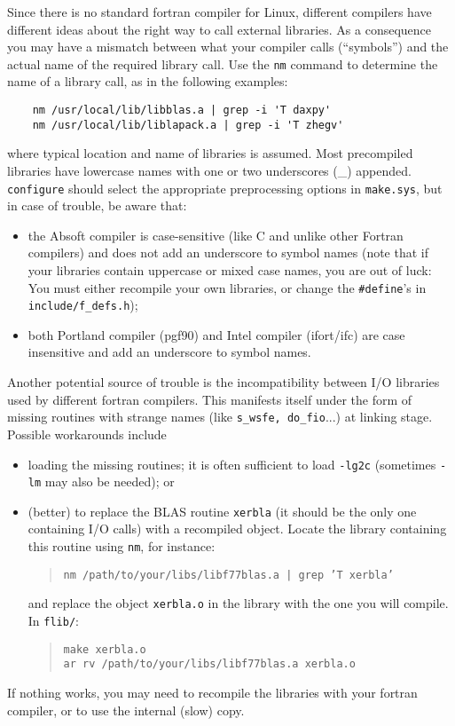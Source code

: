 \documentclass[12pt,a4paper]{article}
\begin{document}
Since there is no standard fortran compiler for Linux, different compilers
have different ideas about the right way to call external libraries.
As a consequence you may have a mismatch between what your compiler
calls (``symbols'') and the actual name of the required library call.
Use the \texttt{nm} command to determine the name of a library call,
as in the following examples:%
\begin{verbatim}
    nm /usr/local/lib/libblas.a | grep -i 'T daxpy'
    nm /usr/local/lib/liblapack.a | grep -i 'T zhegv'
\end{verbatim}
where typical location and name of libraries is assumed.
Most precompiled libraries have lowercase names with one or two
underscores (\_) appended. \texttt{configure} should select the 
appropriate preprocessing options in \texttt{make.sys}, but in
case of trouble, be aware that:
\begin{itemize}
  \item the Absoft compiler is case-sensitive (like C and unlike
        other Fortran compilers) and does not add an underscore
        to symbol names (note that if your libraries contain 
        uppercase or mixed case names, you are out of luck:
        You must either recompile your own libraries, or change 
        the \texttt{\#define}'s in \texttt{include/f\_defs.h});
  \item both Portland compiler (pgf90) and Intel compiler (ifort/ifc)
        are case insensitive and add an underscore to symbol names.
\end{itemize}

Another potential source of trouble is the incompatibility
between I/O libraries used by different fortran compilers.
This manifests itself under the form of missing routines with 
strange names (like \texttt{s\_wsfe, do\_fio}...) at linking stage. 
Possible workarounds include
\begin{itemize}
\item loading the missing routines; it is often sufficient to load
\texttt{-lg2c} (sometimes \texttt{-lm} may also be needed); or
\item (better) to replace the BLAS routine {\tt xerbla} (it should
be the only one containing I/O calls) with a recompiled object. 
Locate the library containing this routine using \texttt{nm}, 
for instance:
\begin{quote}
  {\tt nm /path/to/your/libs/libf77blas.a | grep 'T xerbla'}
\end{quote}
and replace the object  \texttt{xerbla.o} in the library with the 
one you will compile. In \texttt{flib/}:
\begin{quote}
{\tt make xerbla.o} \\
{\tt ar rv /path/to/your/libs/libf77blas.a xerbla.o}
\end{quote}
\end{itemize}
If nothing works, you may need to recompile the libraries with 
your fortran compiler, or to use the internal (slow) copy.
\end{document}
